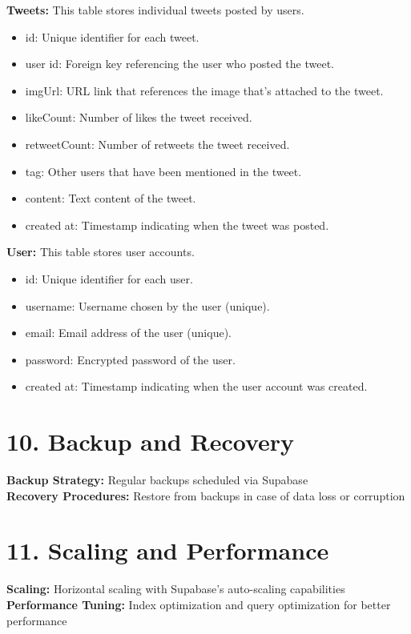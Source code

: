 \documentclass{article}
\begin{document}
\textbf{Tweets:} This table stores individual tweets posted by users.
\begin{itemize}[label=--]
    \item id: Unique identifier for each tweet.
    \item user id: Foreign key referencing the user who posted the tweet.
    \item imgUrl: URL link that references the image that's attached to the tweet.
    \item likeCount: Number of likes the tweet received.
    \item retweetCount: Number of retweets the tweet received.
    \item tag: Other users that have been mentioned in the tweet.
    \item content: Text content of the tweet.
    \item created at: Timestamp indicating when the tweet was posted.
\end{itemize}
\textbf{User:} This table stores user accounts.
\begin{itemize}[label=--]
    \item id: Unique identifier for each user.
    \item username: Username chosen by the user (unique).
    \item email: Email address of the user (unique).
    \item password: Encrypted password of the user.
    \item created at: Timestamp indicating when the user account was created.
\end{itemize}

\section*{10. Backup and Recovery}
\textbf{Backup Strategy:} Regular backups scheduled via Supabase \\
\textbf{Recovery Procedures:} Restore from backups in case of data loss or corruption

\section*{11. Scaling and Performance}
\textbf{Scaling:} Horizontal scaling with Supabase's auto-scaling capabilities \\
\textbf{Performance Tuning:} Index optimization and query optimization for better performance
\end{document}
